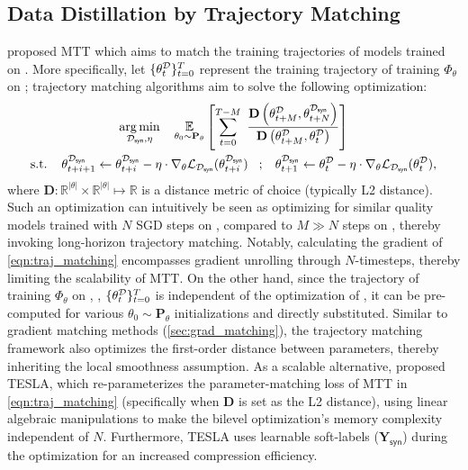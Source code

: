 \documentclass[10pt]{article} %
\begin{document}
\subsection{Data Distillation by Trajectory Matching} \label{sec:traj_matching}
\citet{mtt} proposed MTT which aims to match the training trajectories of models trained on \dataset \vs \distill. More specifically, let $\{ \theta_t^\mathcal{D} \}_{t=0}^T$ represent the training trajectory of training $\Phi_\theta$ on \dataset; trajectory matching algorithms aim to solve the following optimization:
\begin{equation} \label{eqn:traj_matching}
\begin{gathered}
    \underset{\distill, \eta}{\operatorname{arg} \operatorname{min}} \hspace{0.4cm} \expectation{\substack{\theta_0 \sim \mathbf{P}_\theta}}{\sum_{t=0}^{T-M} ~ \frac{\mathbf{D}\left( \theta_{t+M}^\dataset, \theta_{t+N}^{\distill} \right)}{\mathbf{D}\left( \theta_{t+M}^\dataset, \theta_{t}^{\dataset} \right)}} \\ %
    \text{s.t.} \hspace{0.4cm} \theta_{t+i+1}^{\distill} \leftarrow \theta_{t+i}^{\distill} - \eta \cdot \nabla_\theta \mathcal{L}_{\distill}(\theta_{t+i}^{\distill}) \hspace{0.3cm};\hspace{0.3cm} \theta_{t+1}^{\distill} \leftarrow \theta_{t}^{\dataset} - \eta \cdot \nabla_\theta \mathcal{L}_{\distill}(\theta_{t}^{\dataset}) ,
\end{gathered}
\end{equation}
where $\mathbf{D} : \mathbb{R}^{|\theta|} \times \mathbb{R}^{|\theta|} \mapsto \mathbb{R}$ is a distance metric of choice (typically L2 distance). Such an optimization can intuitively be seen as optimizing for similar quality models trained with $N$ SGD steps on \distill, compared to $M \gg N$ steps on \dataset, thereby invoking long-horizon trajectory matching. Notably, calculating the gradient of \cref{eqn:traj_matching} \wrt \distill encompasses gradient unrolling through $N$-timesteps, thereby limiting the scalability of MTT. On the other hand, since the trajectory of training $\Phi_\theta$ on \dataset, \ie, $\{ \theta_t^\mathcal{D} \}_{t=0}^T$ is independent of the optimization of \distill, it can be pre-computed for various $\theta_0 \sim \mathbf{P}_\theta$ initializations and directly substituted. Similar to gradient matching methods (\cref{sec:grad_matching}), the trajectory matching framework also optimizes the first-order distance between parameters, thereby inheriting the local smoothness assumption. As a scalable alternative, \citet{tesla} proposed TESLA, which re-parameterizes the parameter-matching loss of MTT in \cref{eqn:traj_matching} (specifically when $\mathbf{D}$ is set as the L2 distance), using linear algebraic manipulations to make the bilevel optimization's memory complexity independent of $N$. Furthermore, TESLA uses learnable soft-labels ($\mathbf{Y}_{\mathsf{syn}}$) during the optimization for an increased compression efficiency.
\end{document}
